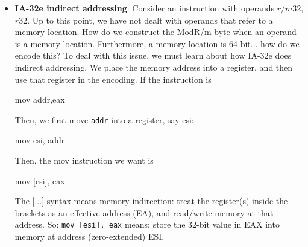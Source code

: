 \documentclass{report}
\begin{document}
\begin{itemize}
\begin{cppcode}
                movsxd  rax, esi
                mov     [rdi],     rax       ; retbuf->x = a
                lea     rcx, [rax+1]
                mov     [rdi+8],   rcx       ; retbuf->y = a + 1
                lea     rcx, [rax+2]
                mov     [rdi+16],  rcx       ; retbuf->z = a + 2

                mov     rax, rdi             ; return same pointer per ABI
                ret
            \end{cppcode}
            \bigbreak \noindent 
            Note that \texttt{movsxd} is move with Sign-Extend Doubleword. It is a 64-bit mode (x86-64) instruction that copies a 32-bit (doubleword) source operand to a 64-bit (quadword) destination register while preserving its signed value by sign-extending the most significant bit.
            \bigbreak \noindent 
            \textbf{Note:} If a C++ object has a non-trivial copy constructor or non-trivial destructor, it is passed by invisible reference
            \bigbreak \noindent 
            If you define a constructor yourself, it is considered non-trivial, even if it doesn't do anything
        \item \textbf{IA-32e indirect addressing}: Consider an instruction with operands $r/m32$, $r32$. Up to this point, we have not dealt with operands that refer to a memory location. How do we construct the ModR/m byte when an operand is a memory location. Furthermore, a memory location is 64-bit... how do we encode this?
            \bigbreak \noindent 
            To deal with this issue, we must learn about how IA-32e does indirect addressing. We place the memory address into a register, and then use that register in the encoding. If the instruction is
            \bigbreak \noindent 
            \begin{cppcode}
            mov   addr,eax
            \end{cppcode}
            \bigbreak \noindent 
            Then, we first move \texttt{addr} into a register, say esi:
            \bigbreak \noindent 
            \begin{cppcode}
            mov   esi, addr 
            \end{cppcode}
            \bigbreak \noindent 
            Then, the mov instruction we want is
            \bigbreak \noindent 
            \begin{cppcode}
            mov   [esi], eax 
            \end{cppcode}
            \bigbreak \noindent 
            The [...] syntax means memory indirection: treat the register(s) inside the brackets as an effective address (EA), and read/write memory at that address. So: \texttt{mov [esi], eax} means: store the 32-bit value in EAX into memory at address (zero-extended) ESI.

\end{itemize}
\end{document}
